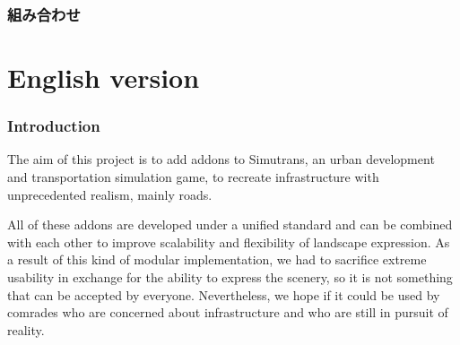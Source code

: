 \documentclass{jarticle}
\begin{document}
\newpage

\section{組み合わせ}




\newpage

\part{English version}

\section{Introduction}

The aim of this project is to add addons to Simutrans, an urban development and transportation simulation game, to recreate infrastructure with unprecedented realism, mainly roads.

All of these addons are developed under a unified standard and can be combined with each other to improve scalability and flexibility of landscape expression.
As a result of this kind of modular implementation, we had to sacrifice extreme usability in exchange for the ability to express the scenery, so it is not something that can be accepted by everyone.
Nevertheless, we hope if it could be used by comrades who are concerned about infrastructure and who are still in pursuit of reality.
\end{document}
